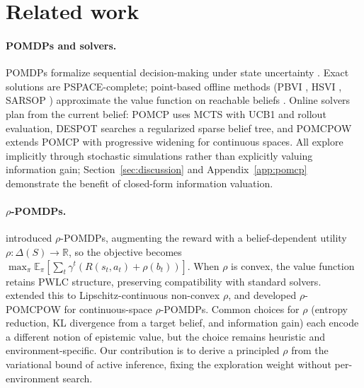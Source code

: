 \documentclass{article}
\begin{document}
\section{Related work}

\paragraph{POMDPs and solvers.}
POMDPs formalize sequential decision-making under state uncertainty \citep{smallwood1973, kaelbling1998}. Exact solutions are PSPACE-complete; point-based offline methods (PBVI \citep{pineau2003}, HSVI \citep{smith2004}, SARSOP \citep{kurniawati2008}) approximate the value function on reachable beliefs \citep{shani2013}. Online solvers plan from the current belief: POMCP \citep{silver2010} uses MCTS with UCB1 and rollout evaluation, DESPOT \citep{ye2017} searches a regularized sparse belief tree, and POMCPOW \citep{sunberg2018} extends POMCP with progressive widening for continuous spaces. All explore implicitly through stochastic simulations rather than explicitly valuing information gain; Section~\ref{sec:discussion} and Appendix~\ref{app:pomcp} demonstrate the benefit of closed-form information valuation.

\paragraph{$\rho$-POMDPs.}
\citet{araya2010} introduced $\rho$-POMDPs, augmenting the reward with a belief-dependent utility $\rho : \Delta(S) \to \mathbb{R}$, so the objective becomes $\max_\pi \mathbb{E}_\pi[\sum_t \gamma^t (R(s_t,a_t) + \rho(b_t))]$. When $\rho$ is convex, the value function retains PWLC structure, preserving compatibility with standard solvers. \citet{fehr2018} extended this to Lipschitz-continuous non-convex $\rho$, and \citet{benchetrit2025} developed $\rho$-POMCPOW for continuous-space $\rho$-POMDPs. Common choices for $\rho$ (entropy reduction, KL divergence from a target belief, and information gain) each encode a different notion of epistemic value, but the choice remains heuristic and environment-specific. Our contribution is to derive a principled $\rho$ from the variational bound of active inference, fixing the exploration weight without per-environment search.
\end{document}
